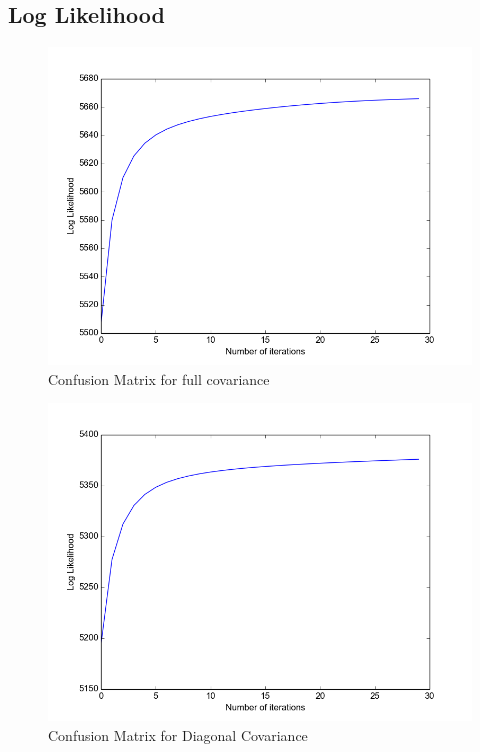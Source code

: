 \documentclass[11pt,a4paper]{article}
\begin{document}
\subsection{Log Likelihood}
\begin{minipage}[b]{0.5\textwidth}
\begin{figure}[H]
  \centering
  \includegraphics[width=.8\linewidth]{Figures/likelihood_HW0.png}
  \caption{Confusion Matrix for full covariance}
  \label{fig:sfig1}
\end{figure}%
\end{minipage}
\begin{minipage}[b]{0.5\textwidth}
\begin{figure}[H]
  \centering
  \includegraphics[width=.8\linewidth]{Figures/likelihood_HW1.png}
\caption{Confusion Matrix for Diagonal Covariance}
  \label{fig:sfig1}
\end{figure}%
\end{minipage}
\end{document}
